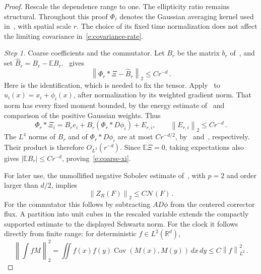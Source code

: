 \documentclass[11pt]{amsart}
\theoremstyle{definition}
\theoremstyle{remark}
\numberwithin{equation}{section}
\newcommand{\E}{\mathbb E}
\newcommand{\R}{\mathbb R}
\newcommand{\dd}{\,d}
\newcommand{\Cov}{\operatorname{Cov}}
\newcommand{\norm}[1]{\left\|#1\right\|}
\begin{document}
\begin{proof}
Rescale the dependence range to one. The ellipticity ratio remains structural. Throughout this proof $\Phi_r$ denotes the Gaussian averaging kernel used in~\citet[Theorem~4.6]{AKM2019book}, with spatial scale $r$. The choice of its fixed time normalization does not affect the limiting covariance in~\eqref{e:covariance-rate}.

\emph{Step 1.} Coarse coefficients and the commutator. Let $B_r$ be the matrix $b_r$ of~\citet[Definition 5.23]{AKM2019book}, and set $\widehat B_r=B_r-\E B_r$.~\citet[Lemma~5.24]{AKM2019book} gives
\begin{equation}\label{e:coarse-xi}
 \norm{\Phi_r*\Xi-\widehat B_r}_2\leq Cr^{-d}\, .
\end{equation}
Here is the identification, which is needed to fix the tensor. Apply~\citet[(5.64)]{AKM2019book} to $u_i(x)=x_i+\phi_i(x)$, after normalization by its weighted gradient norm. That norm has every fixed moment bounded, by the energy estimate of~\citet[(4.4)]{AKM2019book} and comparison of the positive Gaussian weights. Thus
\begin{equation*}
 \Phi_r*\Xi_i=B_re_i+B_r(\Phi_r*D\phi_i)+E_{r,i},
 \qquad \norm{E_{r,i}}_2\leq Cr^{-d}\, .
\end{equation*}
The $L^4$ norms of $B_r$ and of $\Phi_r*D\phi_i$ are at most $Cr^{-d/2}$, by~\citet[(5.63)]{AKM2019book} and~\citet[Theorem~4.1]{AKM2019book}, respectively. Their product is therefore $O_{L^2}(r^{-d})$. Since $\E\Xi=0$, taking expectations also gives $|\E B_r|\leq Cr^{-d}$, proving~\eqref{e:coarse-xi}.

For later use, the unmollified negative Sobolev estimate of~\citet[(4.126)]{AKM2019book}, with $p=2$ and order larger than $d/2$, implies
\begin{equation}\label{e:test-clt}
 \norm{Z_R(F)}_2\leq C\mathcal N(F)\, .
\end{equation}
For the commutator this follows by subtracting $A D\phi$ from the centered corrector flux. A partition into unit cubes in the rescaled variable extends the compactly supported estimate to the displayed Schwartz norm. For the clock it follows directly from finite range: for deterministic $f\in L^2(\R^d)$,
\begin{equation}\label{e:clock-l2}
 \norm{\int fM}_2^2
 =\iint f(x)f(y)\Cov(M(x),M(y))\dd x\dd y
 \leq C\norm f_{L^2}^2\, .
\end{equation}


\end{proof}
\end{document}
